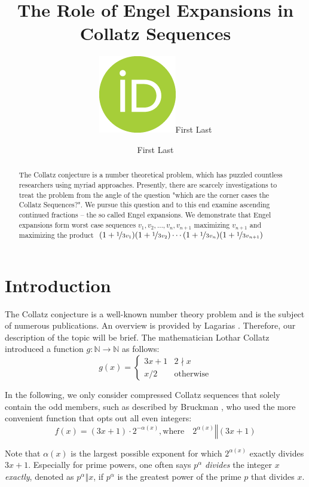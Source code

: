 \documentclass[12pt]{amsart}
\title[Engel Expansions in Collatz Sequences]{The Role of Engel Expansions in Collatz Sequences}
\author[F.\ Last1]{\href{https://orcid.org/0000-0000-0000-0000}{\includegraphics[scale=0.06]{orcid.png}}\hspace{1mm}First Last}
\author[F.\ Last2]{First Last}
\theoremstyle{definition}
\begin{document}
	
\begingroup
\let\MakeUppercase\relax
\maketitle
\endgroup

\begin{abstract}
The Collatz conjecture is a number theoretical problem, which has puzzled countless researchers using myriad approaches. Presently, there are scarcely investigations to treat the problem from the angle of the question "which are the corner cases the Collatz Sequences?". We pursue this question and to this end examine ascending continued fractions -- the so called Engel expansions. We demonstrate that Engel expansions form worst case sequences $v_1,v_2,\ldots,v_n,v_{n+1}$ maximizing $v_{n+1}$ and maximizing the product $(1+\nicefrac{1}{3v_1})(1+\nicefrac{1}{3v_2})\cdots(1+\nicefrac{1}{3v_n})(1+\nicefrac{1}{3v_{n+1}})$
\end{abstract}

\section{Introduction}
\label{introduction}

The Collatz conjecture is a well-known number theory problem and is the subject of numerous publications. An overview is provided by Lagarias \cite{Ref_Lagarias_2010}. Therefore, our description of the topic will be brief. The mathematician Lothar Collatz introduced a function $g:\mathbb{N}\rightarrow\mathbb{N}$ as follows:
\begin{equation}
\label{eq:func_collatz}
g(x)=
\begin{cases}
3x+1	&	2\nmid x\\
x/2		&	\text{otherwise}
\end{cases}
\end{equation}

In the following, we only consider compressed Collatz sequences that solely contain the odd members, such as described by Bruckman \cite{Ref_Bruckman_2008}, who used the more convenient function that opts out all even integers:
\begin{equation}
\label{eq:func_collatz_odd}
f(x)=(3x+1)\cdot2^{-\alpha(x)},\text{where}\hspace{1em}2^{\alpha(x)}\mathrel\Vert(3x+1)
\end{equation}

Note that $\alpha(x)$ is the largest possible exponent for which $2^{\alpha(x)}$ exactly divides $3x+1$. Especially for prime powers, one often says $p^\alpha$ \textit{divides} the integer $x$ \textit{exactly}, denoted as $p^\alpha\mathrel\Vert x$, if $p^\alpha$ is the greatest power of the prime $p$ that divides $x$.
\end{document}
